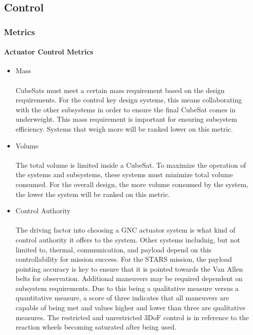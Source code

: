 
\subsection{Control}
\subsubsection{Metrics}
\paragraph{Actuator Control Metrics}
\begin{itemize}
\item{Mass}\\ 
\\
CubeSats must meet a certain mass requirement based on the design requirements. For the control key design systems, this means collaborating with the other subsystems in order to ensure the final CubeSat comes in underweight. This mass requirement is important for ensuring subsystem efficiency. Systems that weigh more will be ranked lower on this metric.
\\
\item{Volume} \\
\\
The total volume is limited inside a CubeSat. To maximize the operation of the systems and subsystems, these systems must minimize total volume consumed. For the overall design, the more volume consumed by the system, the lower the system will be ranked on this metric.
\\
\item{Control Authority} \\
\\
The driving factor into choosing a GNC actuator system is what kind of control authority it offers to the system. Other systems includnig, but not limited to, thermal, communication, and payload depend on this controllability for mission success. For the STARS mission, the payload pointing accuracy is key to ensure that it is pointed towards the Van Allen belts for observation. Additional maneuvers may be required dependent on subsystem requirements. Due to this being a qualitative measure versus a quantitative measure, a score of three indicates that all maneuvers are capable of being met and values higher and lower than three are qualitative measures. The restricted and unrestricted 3DoF control is in reference to the reaction wheels becoming saturated after being used. 
\\

\end{itemize}
